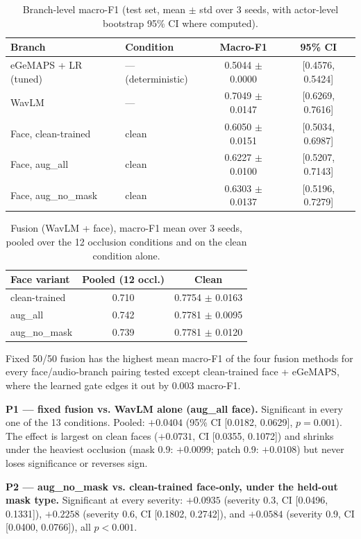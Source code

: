 \documentclass[10pt]{article}
\begin{document}
\begin{table}[h]
\small
\centering
\caption{Branch-level macro-F1 (test set, mean $\pm$ std over 3 seeds, with actor-level bootstrap 95\% CI
where computed).}
\label{tab:branch}
\begin{tabular}{llcc}
\toprule
Branch & Condition & Macro-F1 & 95\% CI \\
\midrule
eGeMAPS + LR (tuned) & --- (deterministic) & 0.5044 $\pm$ 0.0000 & [0.4576, 0.5424] \\
WavLM & --- & 0.7049 $\pm$ 0.0147 & [0.6269, 0.7616] \\
Face, clean-trained & clean & 0.6050 $\pm$ 0.0151 & [0.5034, 0.6987] \\
Face, aug\_all & clean & 0.6227 $\pm$ 0.0100 & [0.5207, 0.7143] \\
Face, aug\_no\_mask & clean & 0.6303 $\pm$ 0.0137 & [0.5196, 0.7279] \\
\bottomrule
\end{tabular}
\end{table}

\begin{table}[h]
\small
\centering
\caption{Fusion (WavLM + face), macro-F1 mean over 3 seeds, pooled over the 12 occlusion conditions and
on the clean condition alone.}
\label{tab:fusion}
\begin{tabular}{lcc}
\toprule
Face variant & Pooled (12 occl.) & Clean \\
\midrule
clean-trained & 0.710 & 0.7754 $\pm$ 0.0163 \\
aug\_all & 0.742 & 0.7781 $\pm$ 0.0095 \\
aug\_no\_mask & 0.739 & 0.7781 $\pm$ 0.0120 \\
\bottomrule
\end{tabular}
\end{table}

Fixed 50/50 fusion has the highest mean macro-F1 of the four fusion methods for every face/audio-branch
pairing tested except clean-trained face + eGeMAPS, where the learned gate edges it out by 0.003
macro-F1.

\textbf{P1 --- fixed fusion vs. WavLM alone (aug\_all face).} Significant in every one of the 13 conditions.
Pooled: $+0.0404$ (95\% CI [0.0182, 0.0629], $p = 0.001$). The effect is largest on clean faces ($+0.0731$,
CI [0.0355, 0.1072]) and shrinks under the heaviest occlusion (mask 0.9: $+0.0099$; patch 0.9: $+0.0108$) but
never loses significance or reverses sign.

\textbf{P2 --- aug\_no\_mask vs. clean-trained face-only, under the held-out mask type.} Significant at every
severity: $+0.0935$ (severity 0.3, CI [0.0496, 0.1331]), $+0.2258$ (severity 0.6, CI [0.1802, 0.2742]), and
$+0.0584$ (severity 0.9, CI [0.0400, 0.0766]), all $p < 0.001$.
\end{document}
